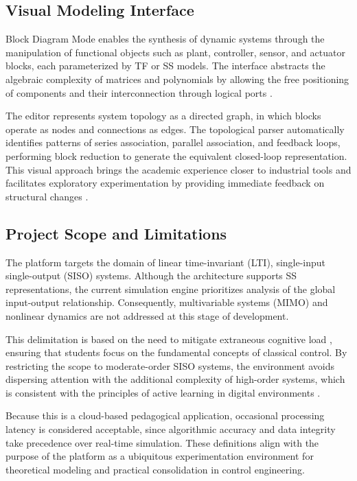 \documentclass[conference]{IEEEtran}
\begin{document}
\subsection{Visual Modeling Interface}

Block Diagram Mode enables the synthesis of dynamic systems through the manipulation of functional objects such as plant, controller, sensor, and actuator blocks, each parameterized by TF or SS models. The interface abstracts the algebraic complexity of matrices and polynomials by allowing the free positioning of components and their interconnection through logical ports \cite{nascimento2025}.

The editor represents system topology as a directed graph, in which blocks operate as nodes and connections as edges. The topological parser automatically identifies patterns of series association, parallel association, and feedback loops, performing block reduction to generate the equivalent closed-loop representation. This visual approach brings the academic experience closer to industrial tools and facilitates exploratory experimentation by providing immediate feedback on structural changes \cite{reznichenko2025}.

\subsection{Project Scope and Limitations}

The platform targets the domain of linear time-invariant (LTI), single-input single-output (SISO) systems. Although the architecture supports SS representations, the current simulation engine prioritizes analysis of the global input-output relationship. Consequently, multivariable systems (MIMO) and nonlinear dynamics are not addressed at this stage of development.

This delimitation is based on the need to mitigate extraneous cognitive load \cite{SWELLER2024102423}, ensuring that students focus on the fundamental concepts of classical control. By restricting the scope to moderate-order SISO systems, the environment avoids dispersing attention with the additional complexity of high-order systems, which is consistent with the principles of active learning in digital environments \cite{nascimento2025}.

Because this is a cloud-based pedagogical application, occasional processing latency is considered acceptable, since algorithmic accuracy and data integrity take precedence over real-time simulation. These definitions align with the purpose of the platform as a ubiquitous experimentation environment for theoretical modeling and practical consolidation in control engineering.
\end{document}
